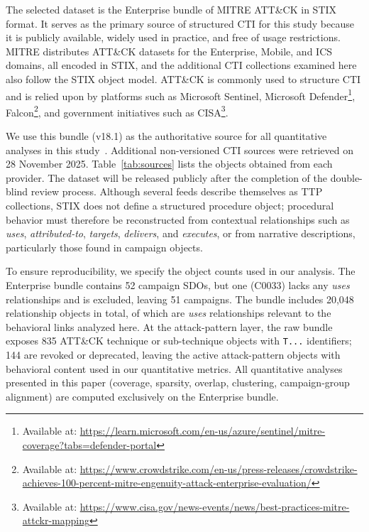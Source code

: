 \documentclass[sigconf]{acmart}
\newcommand{\stix}{STIX\xspace}
\newcommand{\mitre}{MITRE\xspace}
\newcommand{\attack}{ATT\&CK\xspace}
\begin{document}
The selected dataset is the Enterprise bundle of \mitre{} \attack{} in \stix{} format. It serves as the primary source of structured CTI for this study because it is publicly available, widely used in practice, and free of usage restrictions. \mitre{} distributes \attack{} datasets for the Enterprise, Mobile, and ICS domains, all encoded in \stix{}, and the additional CTI collections examined here also follow the \stix{} object model. \attack{} is commonly used to structure CTI and is relied upon by platforms such as Microsoft Sentinel, Microsoft Defender\footnote{Available at: \url{https://learn.microsoft.com/en-us/azure/sentinel/mitre-coverage?tabs=defender-portal}}, Falcon\footnote{Available at: \url{https://www.crowdstrike.com/en-us/press-releases/crowdstrike-achieves-100-percent-mitre-engenuity-attack-enterprise-evaluation/}}, and government initiatives such as CISA\footnote{Available at: \url{https://www.cisa.gov/news-events/news/best-practices-mitre-attckr-mapping}}.

We use this bundle (v18.1) as the authoritative source for all quantitative analyses in this study~\cite{strom2018mitre}. Additional non-versioned CTI sources were retrieved on 28 November 2025. Table~\ref{tab:sources} lists the objects obtained from each provider. The dataset will be released publicly after the completion of the double-blind review process. Although several feeds describe themselves as TTP collections, \stix{} does not define a structured procedure object; procedural behavior must therefore be reconstructed from contextual relationships such as \textit{uses}, \textit{attributed-to}, \textit{targets}, \textit{delivers}, and \textit{executes}, or from narrative descriptions, particularly those found in campaign objects.

To ensure reproducibility, we specify the object counts used in our analysis. The Enterprise bundle contains 52 campaign SDOs, but one (C0033) lacks any \textit{uses} relationships and is excluded, leaving 51 campaigns. The bundle includes 20,048 relationship objects in total, of which \nRelationships{} are \textit{uses} relationships relevant to the behavioral links analyzed here. At the attack-pattern layer, the raw bundle exposes 835 \attack{} technique or sub-technique objects with \texttt{T...} identifiers; 144 are revoked or deprecated, leaving the \nAttackPatternObjects{} active attack-pattern objects with behavioral content used in our quantitative metrics. All quantitative analyses presented in this paper (coverage, sparsity, overlap, clustering, campaign-group alignment) are computed exclusively on the Enterprise bundle.
\end{document}
